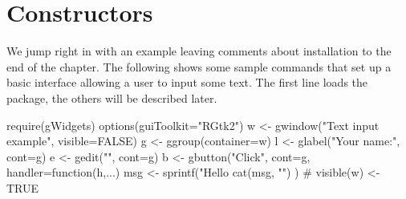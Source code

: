 






\section{Constructors}
\label{sec:constructors}

We jump right in with an example leaving comments about installation
to the end of the chapter. The following shows some sample
 commands that set up a basic interface allowing a user
to input some text. The first line loads the package, the others will
be described later.

\begin{Schunk}
\begin{Sinput}
 require(gWidgets)
 options(guiToolkit="RGtk2")
 w <- gwindow("Text input example", visible=FALSE)
 g <- ggroup(container=w)
 l <- glabel("Your name:", cont=g)
 e <- gedit("", cont=g)
 b <- gbutton("Click", cont=g, handler=function(h,...) {
   msg <- sprintf("Hello %
   cat(msg, "\n")
 })
 #
 visible(w) <- TRUE
\end{Sinput}
\end{Schunk}


